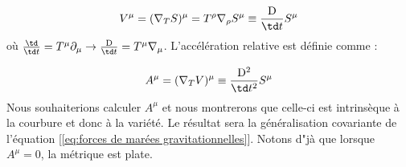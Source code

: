 \begin{equation}
    V^{\mu} = (\nabla_{T}S)^{\mu} = T^{\rho}\nabla_{\rho}S^{\mu} \equiv \frac{\mathrm{D}}{\td t}S^{\mu}
\end{equation}
où $\frac{\td }{\td t} = T^{\mu}\partial_{\mu} \rightarrow \frac{\mathrm{D} }{\td t} = T^{\mu}\nabla_{\mu}$. L'accélération relative est définie comme :

\begin{equation}
    A^{\mu} = (\nabla_{T}V)^{\mu}\equiv\frac{\mathrm{D} ^2}{\td t^2}S^{\mu}
\end{equation}
Nous souhaiterions calculer $A^\mu$ et nous montrerons que celle-ci est intrinsèque à la courbure et donc à la variété.
Le résultat sera la généralisation covariante de l'équation [\ref{eq:forces de marées gravitationnelles}]. Notons d"jà que lorsque $A^{\mu}=0$, la métrique est plate. 

